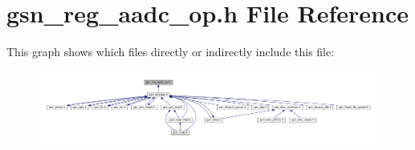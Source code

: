 \hypertarget{a00542}{
\section{gsn\_\-reg\_\-aadc\_\-op.h File Reference}
\label{a00542}
}
This graph shows which files directly or indirectly include this file:
\nopagebreak
\begin{figure}[H]
\begin{center}
\leavevmode
\includegraphics[width=400pt]{a00781}
\end{center}
\end{figure}
